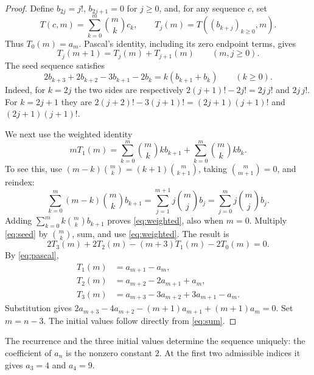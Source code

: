 \documentclass[11pt]{article}
\begin{document}
\begin{proof}
Define $b_{2j}=j!$, $b_{2j+1}=0$ for $j\geq0$, and, for any sequence $c$, set
\[
 T(c,m)=\sum_{k=0}^{m}\binom mk c_k,\qquad
 T_j(m)=T((b_{k+j})_{k\geq0},m).
\]
Thus $T_0(m)=a_m$. Pascal's identity, including its zero endpoint terms, gives
\begin{equation}\label{eq:pascal}
 T_j(m+1)=T_j(m)+T_{j+1}(m)\qquad(m,j\geq0).
\end{equation}
The seed sequence satisfies
\begin{equation}\label{eq:seed}
 2b_{k+3}+2b_{k+2}-3b_{k+1}-2b_k
       =k(b_{k+1}+b_k)\qquad(k\geq0).
\end{equation}
Indeed, for $k=2j$ the two sides are respectively
$2(j+1)!-2j!=2j\,j!$ and $2j\,j!$.
For $k=2j+1$ they are
$2(j+2)!-3(j+1)!=(2j+1)(j+1)!$ and $(2j+1)(j+1)!$.

We next use the weighted identity
\begin{equation}\label{eq:weighted}
 mT_1(m)=\sum_{k=0}^{m}\binom mk k b_{k+1}
          +\sum_{k=0}^{m}\binom mk k b_k.
\end{equation}
To see this, use
$(m-k)\binom mk=(k+1)\binom m{k+1}$, taking
$\binom m{m+1}=0$, and reindex:
\[
 \sum_{k=0}^{m}(m-k)\binom mk b_{k+1}
 =\sum_{j=1}^{m+1}j\binom mj b_j
 =\sum_{j=0}^{m}j\binom mj b_j.
\]
Adding $\sum_{k=0}^{m}k\binom mk b_{k+1}$ proves
\eqref{eq:weighted}, also when $m=0$.
Multiply \eqref{eq:seed} by $\binom mk$, sum, and use
\eqref{eq:weighted}. The result is
\[
 2T_3(m)+2T_2(m)-(m+3)T_1(m)-2T_0(m)=0.
\]
By \eqref{eq:pascal},
\begin{align*}
 T_1(m)&=a_{m+1}-a_m,\\
 T_2(m)&=a_{m+2}-2a_{m+1}+a_m,\\
 T_3(m)&=a_{m+3}-3a_{m+2}+3a_{m+1}-a_m.
\end{align*}
Substitution gives
$2a_{m+3}-4a_{m+2}-(m+1)a_{m+1}+(m+1)a_m=0$.
Set $m=n-3$. The initial values follow directly from \eqref{eq:sum}.
\end{proof}

The recurrence and the three initial values determine the sequence uniquely:
the coefficient of $a_n$ is the nonzero constant $2$. At the first two
admissible indices it gives $a_3=4$ and $a_4=9$.
\end{document}
